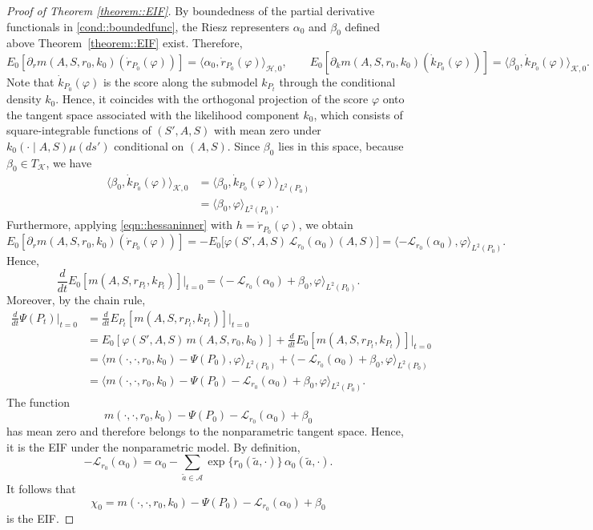 \documentclass[11pt]{article}
\theoremstyle{plain}
\begin{document}
\begin{proof}[Proof of Theorem \ref{theorem::EIF}]
By boundedness of the partial derivative functionals in
\ref{cond::boundedfunc}, the Riesz representers $\alpha_0$ and $\beta_0$
defined above Theorem~\ref{theorem::EIF} exist. Therefore,
\[
E_0\!\left[\partial_r m(A,S,r_0,k_0)(\dot{r}_{P_0}(\varphi))\right] 
= \langle \alpha_0, \dot{r}_{P_0}(\varphi)\rangle_{\mathcal{H}, 0},
\qquad
E_0\!\left[\partial_k m(A,S,r_0,k_0)(\dot{k}_{P_0}(\varphi))\right] 
= \langle \beta_0, \dot{k}_{P_0}(\varphi)\rangle_{\mathcal{K}, 0}.
\]
Note that $\dot{k}_{P_0}(\varphi)$ is the score along the submodel $k_{P_t}$ through the conditional density $k_0$. Hence, it coincides with the orthogonal projection of the score $\varphi$ onto the tangent space associated with the likelihood component $k_0$, which consists of square-integrable functions of $(S',A,S)$ with mean zero under $k_0(\cdot \mid A,S)\mu(ds')$ conditional on $(A,S)$. Since $\beta_0$ lies in this space, because $\beta_0 \in T_{\mathcal{K}}$, we have
\begin{align*}
     \langle \beta_0, \dot{k}_{P_0}(\varphi) \rangle_{\mathcal{K}, 0} 
     &=  \langle \beta_0, \dot{k}_{P_0}(\varphi) \rangle_{L^2(P_0)} \\
     &=  \langle \beta_0, \varphi \rangle_{L^2(P_0)}.
\end{align*}
Furthermore, applying \eqref{eqn::hessaninner} with $h = \dot{r}_{P_0}(\varphi)$, we obtain
\[
E_0\!\left[\partial_r m(A,S,r_0,k_0)(\dot{r}_{P_0}(\varphi))\right] 
= - E_{0}\!\big[\varphi(S',A,S)\,\mathcal{L}_{r_0}(\alpha_0)(A,S)\big]
= \langle - \mathcal{L}_{r_0}(\alpha_0), \varphi \rangle_{L^2(P_0)}.
\]
Hence,
\[
\frac{d}{dt} E_0[m(A,S,r_{P_t},k_{P_t})]\Big|_{t=0} 
= \Big\langle - \mathcal{L}_{r_0}(\alpha_0) + \beta_0, \varphi \Big\rangle_{L^2(P_0)}.
\]
Moreover, by the chain rule,
\begin{align*}
    \frac{d}{dt} \Psi(P_t)\Big|_{t=0} 
    &= \frac{d}{dt} E_{P_t}[m(A,S,r_{P_t},k_{P_t})]\Big|_{t=0} \\
    &= E_0[\varphi(S',A,S)\,m(A,S,r_0,k_0)] 
    + \frac{d}{dt} E_0[m(A,S,r_{P_t},k_{P_t})]\Big|_{t=0} \\
    &= \Big\langle m(\cdot,\cdot,r_0,k_0) - \Psi(P_0), \varphi \Big\rangle_{L^2(P_0)} 
    + \Big\langle - \mathcal{L}_{r_0}(\alpha_0) + \beta_0, \varphi \Big\rangle_{L^2(P_0)} \\
    &= \Big\langle m(\cdot,\cdot,r_0,k_0) - \Psi(P_0) - \mathcal{L}_{r_0}(\alpha_0) + \beta_0, \varphi \Big\rangle_{L^2(P_0)}.
\end{align*}
The function 
\[
m(\cdot,\cdot,r_0,k_0) - \Psi(P_0) - \mathcal{L}_{r_0}(\alpha_0) + \beta_0
\]
has mean zero and therefore belongs to the nonparametric tangent space. Hence, it is the EIF under the nonparametric model. By definition,
\[
- \mathcal{L}_{r_0}(\alpha_0)
= \alpha_0 - \sum_{\tilde a \in \mathcal{A}} \exp\{r_0(\tilde a,\cdot)\}\,\alpha_0(\tilde a,\cdot).
\]
It follows that
\[
\chi_0 = m(\cdot,\cdot,r_0,k_0) - \Psi(P_0) - \mathcal{L}_{r_0}(\alpha_0) + \beta_0
\]
is the EIF.



 
 
\end{proof}
\end{document}
